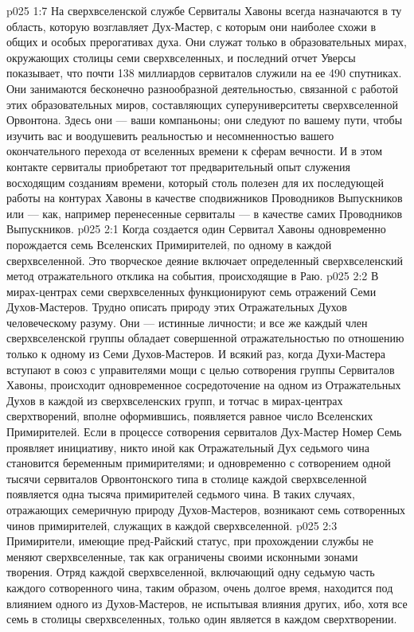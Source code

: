 \vs p025 1:7 На сверхвселенской службе Сервиталы Хавоны всегда назначаются в ту область, которую возглавляет Дух\hyp{}Мастер, с которым они наиболее схожи в общих и особых прерогативах духа. Они служат только в образовательных мирах, окружающих столицы семи сверхвселенных, и последний отчет Уверсы показывает, что почти 138 миллиардов сервиталов служили на ее 490 спутниках. Они занимаются бесконечно разнообразной деятельностью, связанной с работой этих образовательных миров, составляющих суперуниверситеты сверхвселенной Орвонтона. Здесь они --- ваши компаньоны; они следуют по вашему пути, чтобы изучить вас и воодушевить реальностью и несомненностью вашего окончательного перехода от вселенных времени к сферам вечности. И в этом контакте сервиталы приобретают тот предварительный опыт служения восходящим созданиям времени, который столь полезен для их последующей работы на контурах Хавоны в качестве сподвижников Проводников Выпускников или --- как, например перенесенные сервиталы --- в качестве самих Проводников Выпускников.
\vs p025 2:1 Когда создается один Сервитал Хавоны одновременно порождается семь Вселенских Примирителей, по одному в каждой сверхвселенной. Это творческое деяние включает определенный сверхвселенский метод отражательного отклика на события, происходящие в Раю.
\vs p025 2:2 В мирах\hyp{}центрах семи сверхвселенных функционируют семь отражений Семи Духов\hyp{}Мастеров. Трудно описать природу этих Отражательных Духов человеческому разуму. Они --- истинные личности; и все же каждый член сверхвселенской группы обладает совершенной отражательностью по отношению только к одному из Семи Духов\hyp{}Мастеров. И всякий раз, когда Духи\hyp{}Мастера вступают в союз с управителями мощи с целью сотворения группы Сервиталов Хавоны, происходит одновременное сосредоточение на одном из Отражательных Духов в каждой из сверхвселенских групп, и тотчас в мирах\hyp{}центрах сверхтворений, вполне оформившись, появляется равное число Вселенских Примирителей. Если в процессе сотворения сервиталов Дух\hyp{}Мастер Номер Семь проявляет инициативу, никто иной как Отражательный Дух седьмого чина становится беременным примирителями; и одновременно с сотворением одной тысячи сервиталов Орвонтонского типа в столице каждой сверхвселенной появляется одна тысяча примирителей седьмого чина. В таких случаях, отражающих семеричную природу Духов\hyp{}Мастеров, возникают семь сотворенных чинов примирителей, служащих в каждой сверхвселенной.
\vs p025 2:3 Примирители, имеющие пред\hyp{}Райский статус, при прохождении службы не меняют сверхвселенные, так как ограничены своими исконными зонами творения. Отряд каждой сверхвселенной, включающий одну седьмую часть каждого сотворенного чина, таким образом, очень долгое время, находится под влиянием одного из Духов\hyp{}Мастеров, не испытывая влияния других, ибо, хотя все семь  в столицы сверхвселенных, только один является  в каждом сверхтворении.
